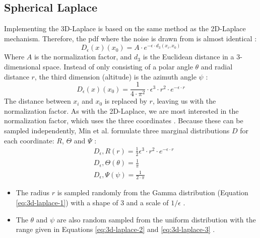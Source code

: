 \subsection{Spherical Laplace}
Implementing the 3D-Laplace is based on the same method as the 2D-Laplace mechanism.
Therefore, the \gls{pdf} where the noise is drawn from is almost identical \citep{9646489}:
\begin{equation}
  D_{\epsilon}(x)(x_0) = A \cdot e^{-\epsilon \cdot d_3(x_i, x_0)}
  \label{eq:3d-laplace-pdf}
\end{equation}
Where $A$ is the normalization factor, and $d_3$ is the Euclidean distance in a 3-dimensional space.
Instead of only consisting of a polar angle $\theta$ and radial distance $r$, the third dimension (altitude) is the azimuth angle $\psi$ \citep{9646489}:
\begin{equation}
  D_{\epsilon}(x)(x_0) = \frac{1}{4 \cdot \pi^2} \cdot \epsilon^3 \cdot r^2 \cdot e^{-\epsilon \cdot r}
  \label{eq:3d-laplace-with-normalization}
\end{equation}
The distance between $x_i$ and $x_0$ is replaced by $r$, leaving us with the normalization factor.
As with the 2D-Laplace, we are most interested in the normalization factor, which uses the three coordinates \citep{9646489}.
Because these can be sampled independently, Min et al. formulate three marginal distributions $D$ for each coordinate: $R$, $\Theta$ and $\Psi$ \citep{9646489}:
\begin{subequations}
  \begin{align}
     & D_\epsilon, R(r) = \frac{1}{2} \epsilon^3 \cdot r^2 \cdot e^{-\epsilon \cdot r} \label{eq:3d-laplace-1} \\
     & D_\epsilon, \Theta(\theta) = \frac{1}{\pi}                                      \label{eq:3d-laplace-2} \\
     & D_\epsilon, \Psi(\psi) = \frac{1}{2 \cdot \pi} \label{eq:3d-laplace-3}
  \end{align}
\end{subequations}
\begin{itemize}
  \item The radius $r$ is sampled randomly from the Gamma distribution (Equation \ref{eq:3d-laplace-1}) with a shape of 3 and a scale of $1/\epsilon$ \citep{9646489}.
  \item The $\theta$ and $\psi$ are also random sampled from the uniform distribution with the range given in Equations \ref{eq:3d-laplace-2} and \ref{eq:3d-laplace-3} \citep{9646489}.
\end{itemize}
